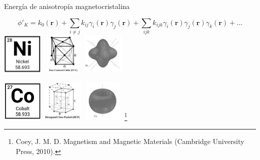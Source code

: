 \documentclass{beamer}
\newcommand\blfootnote[1]{%
  \begingroup
  \renewcommand\thefootnote{}\footnote{#1}%
  \addtocounter{footnote}{-1}%
  \endgroup
}
\begin{document}
\begin{frame}{Energía de anisotropía magnetocristalina}

    \[ \phi'_K = k_0 (\bm{r}) + \sum_{i \neq j} k_{ij} \gamma_i (\bm{r}) \gamma_j(\bm{r}) + \sum_{ijk} k_{ijk} \gamma_i (\bm{r}) \gamma_j (\bm{r}) \gamma_k (\bm{r}) + \dotsc  \]
    \includegraphics[width=2cm,height=2cm]{pic/Ni.png}
    \hspace{2cm}
    \includegraphics[width=2cm,height=2cm]{pic/Ni-crystal.jpg}
    \hspace{2cm}
    \includegraphics[width=2cm,height=2cm]{pic/Ni-anisotropy.png}

    \vspace{0.5cm}
    
    \includegraphics[width=2cm,height=2cm]{pic/Co.png}
    \hspace{2cm}
    \includegraphics[width=2cm,height=2cm]{pic/Co-crystal.jpg}
    \hspace{2cm}
    \includegraphics[width=2cm,height=2cm]{pic/Co-anisotropy.png}
    \blfootnote{ {\tiny Coey, J. M. D. Magnetism and Magnetic Materials (Cambridge University Press, 2010).}}
\end{frame}
\end{document}
